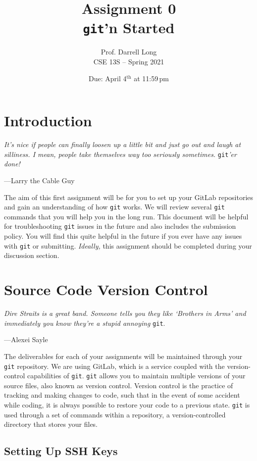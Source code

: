 \documentclass[11pt]{article}
\title{Assignment 0 \\ \texttt{git}'n Started}
\author{Prof. Darrell Long \\ CSE 13S -- Spring 2021}
\date{Due: April 4$^\text{th}$ at 11:59\,pm}
\begin{document}
\maketitle

\section{Introduction}

\textwidth
\epigraph{\emph{It's nice if people can finally loosen up a little bit
and just go out and laugh at silliness. I mean, people take themselves
way too seriously sometimes.}  \texttt{git}\emph{'er done!}}{---Larry the
Cable Guy}

\noindent The aim of this first assignment will be for you to set up your
GitLab repositories and gain an understanding of how \texttt{git} works.
We will review several \texttt{git} commands that you will help you in the long
run. This document will be helpful for troubleshooting \texttt{git} issues in
the future and also includes the submission policy. You will find this quite
helpful in the future if you ever have any issues with \texttt{git} or
submitting. \emph{Ideally,} this assignment should be completed during your
discussion section.

\section{Source Code Version Control}

\epigraph{\emph{Dire Straits is a great band. Someone tells you they like
`Brothers in Arms' and immediately you know they're a stupid annoying}
\texttt{git}.}{---Alexei Sayle}

\noindent The deliverables for each of your assignments will be maintained
through your \texttt{git} repository. We are using GitLab, which is a service coupled with the
version-control capabilities of \texttt{git}. \texttt{git} allows you to
maintain multiple versions of your source files, also known as version control.
Version control is the practice of tracking and making changes to code, such
that in the event of some accident while coding, it is always possible to
restore your code to a previous state. \texttt{git} is used
through a set of commands within a repository, a version-controlled directory
that stores your files.

\subsection{Setting Up SSH Keys}
\end{document}
